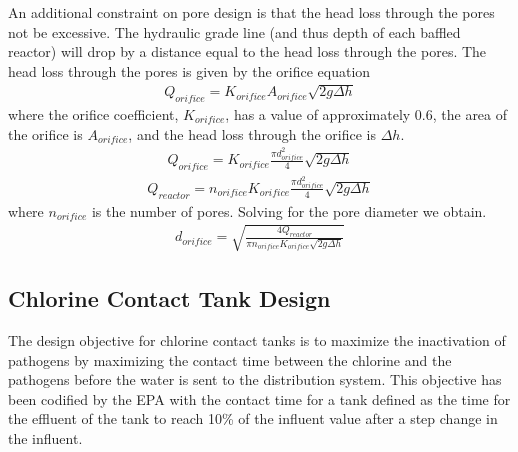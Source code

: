 \documentclass[letterpaper,10pt,english]{sphinxmanual}
\begin{document}
An additional constraint on pore design is that the head loss through the pores not be excessive. The hydraulic grade line (and thus depth of each baffled reactor) will drop by a distance equal to the head loss through the pores. The head loss through the pores is given by the orifice equation
\begin{equation}\label{equation:Reactor_Characteristics/Reactor_Characteristics:Reactor_Characteristics/Reactor_Characteristics:15}
\begin{split}Q_{orifice} =K_{orifice} A_{orifice} \sqrt{2g\Delta h}\end{split}
\end{equation}
where the orifice coefficient, \(K_{orifice}\), has a value of approximately 0.6, the area of the orifice is \(A_{orifice}\), and the head loss through the orifice is \(\Delta h\).
\begin{equation}\label{equation:Reactor_Characteristics/Reactor_Characteristics:Reactor_Characteristics/Reactor_Characteristics:16}
\begin{split}Q_{orifice} =K_{orifice} \frac{\pi d_{orifice}^{2} }{4} \sqrt{2g\Delta h}\end{split}
\end{equation}\begin{equation}\label{equation:Reactor_Characteristics/Reactor_Characteristics:Reactor_Characteristics/Reactor_Characteristics:17}
\begin{split}Q_{reactor} =n_{orifice} K_{orifice} \frac{\pi d_{orifice}^{2} }{4} \sqrt{2g\Delta h}\end{split}
\end{equation}
where \(n_{orifice}\) is the number of pores. Solving for the pore diameter we obtain.
\begin{equation}\label{equation:Reactor_Characteristics/Reactor_Characteristics:Reactor_Characteristics/Reactor_Characteristics:18}
\begin{split}d_{orifice} =\sqrt{\frac{4Q_{reactor} }{\pi n_{orifice} K_{orifice} \sqrt{2g\Delta h} } }\end{split}
\end{equation}

\subsection{Chlorine Contact Tank Design}
\label{\detokenize{Reactor_Characteristics/Reactor_Characteristics:chlorine-contact-tank-design}}
The design objective for chlorine contact tanks is to maximize the inactivation of pathogens by maximizing the contact time between the chlorine and the pathogens before the water is sent to the distribution system. This objective has been codified by the EPA with the contact time for a tank defined as the time for the effluent of the tank to reach 10\% of the influent value after a step change in the influent.
\end{document}
